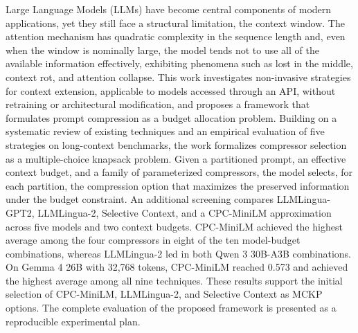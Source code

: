 \begin{foreignabstract}

Large Language Models (LLMs) have become central components of modern applications, yet they still face a structural limitation, the context window. The attention mechanism has quadratic complexity in the sequence length and, even when the window is nominally large, the model tends not to use all of the available information effectively, exhibiting phenomena such as lost in the middle, context rot, and attention collapse. This work investigates non-invasive strategies for context extension, applicable to models accessed through an API, without retraining or architectural modification, and proposes a framework that formulates prompt compression as a budget allocation problem. Building on a systematic review of existing techniques and an empirical evaluation of five strategies on long-context benchmarks, the work formalizes compressor selection as a multiple-choice knapsack problem. Given a partitioned prompt, an effective context budget, and a family of parameterized compressors, the model selects, for each partition, the compression option that maximizes the preserved information under the budget constraint. An additional screening compares LLMLingua-GPT2, LLMLingua-2, Selective Context, and a CPC-MiniLM approximation across five models and two context budgets. CPC-MiniLM achieved the highest average among the four compressors in eight of the ten model-budget combinations, whereas LLMLingua-2 led in both Qwen 3 30B-A3B combinations. On Gemma 4 26B with 32,768 tokens, CPC-MiniLM reached 0.573 and achieved the highest average among all nine techniques. These results support the initial selection of CPC-MiniLM, LLMLingua-2, and Selective Context as MCKP options. The complete evaluation of the proposed framework is presented as a reproducible experimental plan.

\end{foreignabstract}
